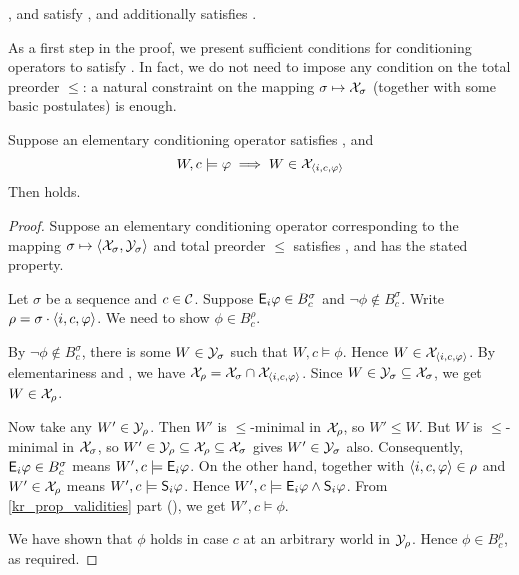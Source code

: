 \begin{proposition}
    \label{kr_prop_examples_satisfy_condsucc}
    \varbasedcond{}, \partbasedcond{} and \scorebasedop{}
    satisfy \condsucc{}, and \scorebasedop{} additionally
    satisfies \strongcondsucc{}.
\end{proposition}

As a first step in the proof, we present sufficient conditions for conditioning
operators to satisfy \condsucc{}. In fact, we do not need to impose any
condition on the total preorder $\le$: a natural constraint on the mapping
$\sigma \mapsto \X_\sigma$ (together with some basic postulates) is enough.

\begin{lemma}
    \label{kr_lemma_conditioning_condsucc_sufficient_condition}
    Suppose an elementary conditioning operator satisfies \kconj{},
    \soundness{} and
    \[
        W, c \models \phi \implies W \in \X_{\tuple{i, c, \phi}}
    \]
    Then \condsucc{} holds.
\end{lemma}

\begin{proof}
    Suppose an elementary conditioning operator corresponding to the mapping
    $\sigma \mapsto \tuple{\X_\sigma, \Y_\sigma}$ and total preorder $\le$
    satisfies \kconj{}, \soundness{} and has the stated property.

    Let $\sigma$ be a sequence and $c \in \C$. Suppose $\E_i\phi \in
    B^\sigma_c$ and $\neg\phi \notin B^\sigma_c$. Write $\rho = \sigma \concat
    \tuple{i, c, \phi}$. We need to show $\phi \in B^\rho_c$.

    By $\neg\phi \notin B^\sigma_c$, there is some $W \in \Y_\sigma$ such that
    $W, c \models \phi$. Hence $W \in \X_{\tuple{i, c, \phi}}$. By
    elementariness and \kconj{}, we have $\X_\rho = \X_\sigma \cap
    \X_{\tuple{i, c, \phi}}$. Since $W \in \Y_\sigma \subseteq \X_\sigma$, we
    get $W \in \X_\rho$.

    Now take any $W' \in \Y_\rho$. Then $W'$ is $\le$-minimal in $\X_\rho$, so
    $W' \le W$. But $W$ is $\le$-minimal in $\X_\sigma$, so $W' \in \Y_\rho
    \subseteq \X_\rho \subseteq \X_\sigma$ gives $W' \in \Y_\sigma$ also.
    Consequently, $\E_i\phi \in B^\sigma_c$ means $W', c \models \E_i\phi$.
    On the other hand, \soundness{} together with $\tuple{i, c, \phi} \in \rho$
    and $W' \in \X_\rho$ means $W', c \models \S_i\phi$. Hence $W', c \models
    \E_i\phi \land \S_i\phi$. From \cref{kr_prop_validities}
    part (), we get $W', c \models \phi$.

    We have shown that $\phi$ holds in case $c$ at an arbitrary world in
    $\Y_\rho$. Hence $\phi \in B^\rho_c$, as required.

\end{proof}

